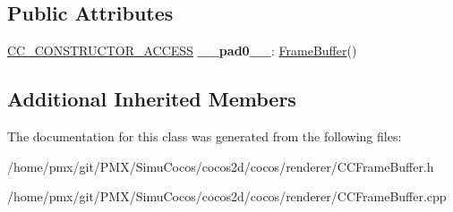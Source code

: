 \subsection*{Public Attributes}
\begin{DoxyCompactItemize}
\item 
\mbox{\label{classexperimental_1_1FrameBuffer_a054c2727c6cc8a832165a25c6696fc43}} 
\hyperlink{_2cocos2d_2cocos_2base_2ccConfig_8h_a25ef1314f97c35a2ed3d029b0ead6da0}{C\+C\+\_\+\+C\+O\+N\+S\+T\+R\+U\+C\+T\+O\+R\+\_\+\+A\+C\+C\+E\+SS} {\bfseries \+\_\+\+\_\+pad0\+\_\+\+\_\+}\+: \hyperlink{classexperimental_1_1FrameBuffer}{Frame\+Buffer}()
\end{DoxyCompactItemize}
\subsection*{Additional Inherited Members}


The documentation for this class was generated from the following files\+:\begin{DoxyCompactItemize}
\item 
/home/pmx/git/\+P\+M\+X/\+Simu\+Cocos/cocos2d/cocos/renderer/C\+C\+Frame\+Buffer.\+h\item 
/home/pmx/git/\+P\+M\+X/\+Simu\+Cocos/cocos2d/cocos/renderer/C\+C\+Frame\+Buffer.\+cpp\end{DoxyCompactItemize}
